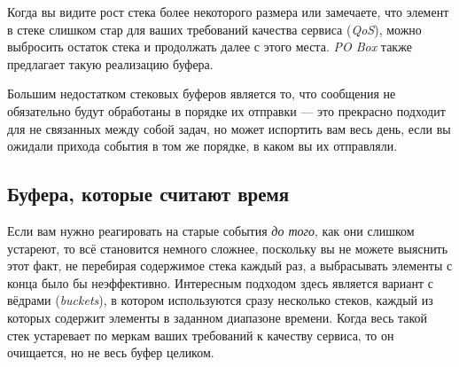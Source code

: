 
Когда вы видите рост стека более некоторого размера или замечаете, что элемент в стеке слишком стар для ваших требований качества сервиса (\emph{QoS}), можно выбросить остаток стека и продолжать далее с этого места. \emph{PO Box} также предлагает такую реализацию буфера.

Большим недостатком стековых буферов является то, что сообщения не обязательно будут обработаны в порядке их отправки --- это прекрасно подходит для не связанных между собой задач, но может испортить вам весь день, если вы ожидали прихода события в том же порядке, в каком вы их отправляли.


\subsection{Буфера, которые считают время}

Если вам нужно реагировать на старые события \emph{до того}, как они слишком устареют, то всё становится немного сложнее, поскольку вы не можете выяснить этот факт, не перебирая содержимое стека каждый раз, а выбрасывать элементы с конца было бы неэффективно. Интересным подходом здесь является вариант с вёдрами (\emph{buckets}), в котором используются сразу несколько стеков, каждый из которых содержит элементы в заданном диапазоне времени. Когда весь такой стек устаревает по меркам ваших требований к качеству сервиса, то он очищается, но не весь буфер целиком.

